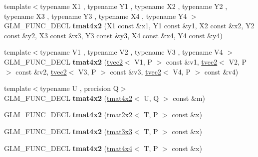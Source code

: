 \begin{DoxyCompactItemize}
\item 
{\footnotesize template$<$typename X1 , typename Y1 , typename X2 , typename Y2 , typename X3 , typename Y3 , typename X4 , typename Y4 $>$ }\\G\+L\+M\+\_\+\+F\+U\+N\+C\+\_\+\+D\+E\+CL {\bfseries tmat4x2} (X1 const \&x1, Y1 const \&y1, X2 const \&x2, Y2 const \&y2, X3 const \&x3, Y3 const \&y3, X4 const \&x4, Y4 const \&y4)\hypertarget{structglm_1_1detail_1_1tmat4x2_a7999df24927e0ce901b39f396c529692}{}\label{structglm_1_1detail_1_1tmat4x2_a7999df24927e0ce901b39f396c529692}

\item 
{\footnotesize template$<$typename V1 , typename V2 , typename V3 , typename V4 $>$ }\\G\+L\+M\+\_\+\+F\+U\+N\+C\+\_\+\+D\+E\+CL {\bfseries tmat4x2} (\hyperlink{structglm_1_1detail_1_1tvec2}{tvec2}$<$ V1, P $>$ const \&v1, \hyperlink{structglm_1_1detail_1_1tvec2}{tvec2}$<$ V2, P $>$ const \&v2, \hyperlink{structglm_1_1detail_1_1tvec2}{tvec2}$<$ V3, P $>$ const \&v3, \hyperlink{structglm_1_1detail_1_1tvec2}{tvec2}$<$ V4, P $>$ const \&v4)\hypertarget{structglm_1_1detail_1_1tmat4x2_abbb030181da4728bc6d618aa24aa17a8}{}\label{structglm_1_1detail_1_1tmat4x2_abbb030181da4728bc6d618aa24aa17a8}

\item 
{\footnotesize template$<$typename U , precision Q$>$ }\\G\+L\+M\+\_\+\+F\+U\+N\+C\+\_\+\+D\+E\+CL {\bfseries tmat4x2} (\hyperlink{structglm_1_1detail_1_1tmat4x2}{tmat4x2}$<$ U, Q $>$ const \&m)\hypertarget{structglm_1_1detail_1_1tmat4x2_a4aa43b25aaebbe320d3442f1a222c229}{}\label{structglm_1_1detail_1_1tmat4x2_a4aa43b25aaebbe320d3442f1a222c229}

\item 
G\+L\+M\+\_\+\+F\+U\+N\+C\+\_\+\+D\+E\+CL {\bfseries tmat4x2} (\hyperlink{structglm_1_1detail_1_1tmat2x2}{tmat2x2}$<$ T, P $>$ const \&x)\hypertarget{structglm_1_1detail_1_1tmat4x2_a0092bc7d0c201c76adfe3ae1b7a78cdf}{}\label{structglm_1_1detail_1_1tmat4x2_a0092bc7d0c201c76adfe3ae1b7a78cdf}

\item 
G\+L\+M\+\_\+\+F\+U\+N\+C\+\_\+\+D\+E\+CL {\bfseries tmat4x2} (\hyperlink{structglm_1_1detail_1_1tmat3x3}{tmat3x3}$<$ T, P $>$ const \&x)\hypertarget{structglm_1_1detail_1_1tmat4x2_a1c7da56ef91ddbc093c429aa5e02da6b}{}\label{structglm_1_1detail_1_1tmat4x2_a1c7da56ef91ddbc093c429aa5e02da6b}

\item 
G\+L\+M\+\_\+\+F\+U\+N\+C\+\_\+\+D\+E\+CL {\bfseries tmat4x2} (\hyperlink{structglm_1_1detail_1_1tmat4x4}{tmat4x4}$<$ T, P $>$ const \&x)\hypertarget{structglm_1_1detail_1_1tmat4x2_a5a1ee2297426e9d916cef04f76bf7030}{}\label{structglm_1_1detail_1_1tmat4x2_a5a1ee2297426e9d916cef04f76bf7030}


\end{DoxyCompactItemize}
